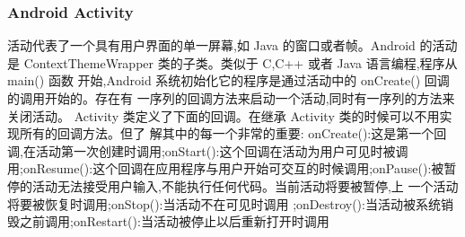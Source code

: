 \documentclass[UTF8]{ctexart}
\begin{document}
\subsubsection{Android Activity}
活动代表了一个具有用户界面的单一屏幕,如 Java 的窗口或者帧。Android 的活动是 ContextThemeWrapper 类的子类。类似于 C,C++ 或者 Java 语言编程,程序从 main() 函数 开始,Android 系统初始化它的程序是通过活动中的 onCreate() 回调的调用开始的。存在有 一序列的回调方法来启动一个活动,同时有一序列的方法来关闭活动。 Activity 类定义了下面的回调。在继承 Activity 类的时候可以不用实现所有的回调方法。但了 解其中的每一个非常的重要: onCreate():这是第一个回调,在活动第一次创建时调用;onStart():这个回调在活动为用户可见时被调用;onResume():这个回调在应用程序与用户开始可交互的时候调用;onPause():被暂停的活动无法接受用户输入,不能执行任何代码。当前活动将要被暂停,上 一个活动将要被恢复时调用;onStop():当活动不在可见时调用 ;onDestroy():当活动被系统销毁之前调用;onRestart():当活动被停止以后重新打开时调用
\end{document}
